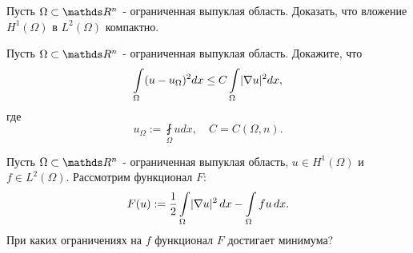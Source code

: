 \begin{exercise}
Пусть $\Omega \subset \real^n$ - ограниченная выпуклая область. Доказать, что вложение $H^1(\Omega)$ в $L^2 (\Omega)$ компактно.
\end{exercise}

\begin{exercise}
Пусть $\Omega \subset \real^n$ - ограниченная выпуклая область. Докажите, что
$$ \int \limits_{\Omega} (u - u_{\Omega})^2 dx \leq C \int \limits_{\Omega} \lvert\nabla u\rvert^2 dx, $$
где
$$ u_{\Omega} := \fint \limits_{\Omega} u dx, \quad C = C(\Omega,n).$$
\end{exercise}

\begin{exercise}
Пусть $\Omega \subset \real^n$ - ограниченная выпуклая область, $u \in H^1(\Omega)$ и $f \in L^2(\Omega)$. Рассмотрим функционал $F$:
$$ F(u) := \frac {1} {2} \int \limits_{\Omega} \lvert\nabla u\rvert^2 \, dx - \int \limits_{\Omega} fu \, dx.$$
При каких ограничениях на $f$ функционал $F$ достигает минимума? 
\end{exercise}